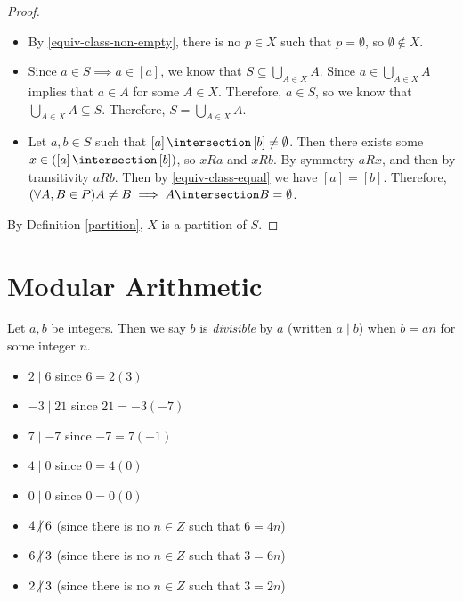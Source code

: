 \documentclass[12pt]{article}
\begin{document}
\begin{proof}\proofbreak
    \begin{itemize}
        \item By \ref{equiv-class-non-empty}, there is no $p \in X$ such that $p = \emptyset$, so $\emptyset \notin X$.
        \item Since $a \in S \implies a \in \left[a\right]$, we know that $S \subseteq \bigcup_{A\in X}A$. Since $a \in \bigcup_{A\in X}A$ implies that $a \in A$ for some $A \in X$. Therefore, $a \in S$, so we know that $\bigcup_{A\in X}A \subseteq S$. Therefore, $S = \bigcup_{A\in X}A$.
        \item Let $a, b \in S$ such that $\left[a\right] \intersection \left[b\right] \neq \emptyset$. Then there exists some $x \in (\left[a\right] \intersection \left[b\right])$, so $x R a$ and $x R b$. By symmetry $a R x$, and then by transitivity $a R b$. Then by \ref{equiv-class-equal} we have $\left[a\right] = \left[b\right]$. Therefore, $(\forall A, B \in P) A \neq B \implies A \intersection B = \emptyset$.
    \end{itemize}
    By Definition \ref{partition}, $X$ is a partition of $S$.
\end{proof}

\section{Modular Arithmetic}

\begin{defn}\label{divisible}
    Let $a, b$ be integers. Then we say $b$ is \emph{divisible} by $a$ (written $a \mid b$) when $b = an$ for some integer $n$.
\end{defn}

\begin{exmp}\proofbreak
    \begin{itemize}
        \item $2 \mid 6$ since $6 = 2(3)$
        \item $-3 \mid 21$ since $21 = -3(-7)$
        \item $7 \mid {-7}$ since $-7 = 7(-1)$
        \item $4 \mid 0$ since $0 = 4(0)$
        \item $0 \mid 0$ since $0 = 0(0)$
    \end{itemize}
\end{exmp}

\begin{exmp}\proofbreak
    \begin{itemize}
        \item $4 \centernot\mid 6$ (since there is no $n \in Z$ such that $6 = 4n$)
        \item $6 \centernot\mid 3$ (since there is no $n \in Z$ such that $3 = 6n$)
        \item $2 \centernot\mid 3$ (since there is no $n \in Z$ such that $3 = 2n$)
    \end{itemize}
\end{exmp}
\end{document}
